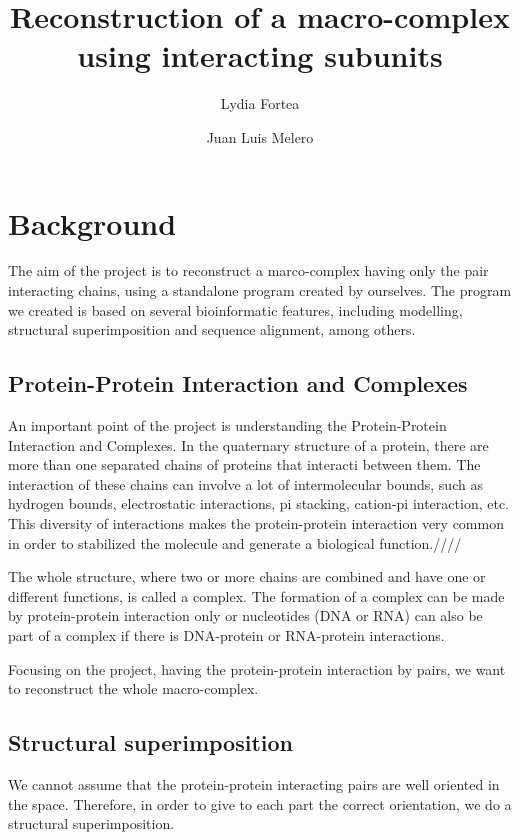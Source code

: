 \documentclass[a4paper,12pt]{report}
\title{Reconstruction of a macro-complex using interacting subunits}
\author{Lydia Fortea \and Juan Luis Melero}
\date{}
\begin{document}
\maketitle
\tableofcontents{}

\chapter{Background}

The aim of the project is to reconstruct a marco-complex having only the pair interacting chains, using a standalone program created by ourselves.
The program we created is based on several bioinformatic features, including modelling, structural superimposition and sequence alignment, among others.

\section{Protein-Protein Interaction and Complexes}

An important point of the project is understanding the Protein-Protein Interaction and Complexes. In the quaternary structure of a protein, there are more than one separated chains of proteins that interacti between them.
The interaction of these chains can involve a lot of intermolecular bounds, such as hydrogen bounds, electrostatic interactions, pi stacking, cation-pi interaction, etc. This diversity of interactions makes the protein-protein interaction
very common in order to stabilized the molecule and generate a biological function.////

The whole structure, where two or more chains are combined and have one or different functions, is called a complex. The formation of a complex can be made by protein-protein interaction only or nucleotides (DNA or RNA) can also be part of a complex if there is DNA-protein or RNA-protein interactions.

Focusing on the project, having the protein-protein interaction by pairs, we want to reconstruct the whole macro-complex.

\section{Structural superimposition}

We cannot assume that the protein-protein interacting pairs are well oriented in the space. Therefore, in order to give to each part the correct orientation, we do a structural superimposition. 
\end{document}

